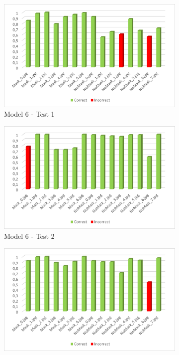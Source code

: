 \documentclass[a4paper,12pt]{article}
\begin{document}
\begin{figure}%
    \centering
    \begin{subfigure}{6cm}
        \includegraphics[width=\linewidth]{images_latex/test6_1.png}
        \caption{Model 6 - Test 1}
    \end{subfigure}
    \qquad
    \begin{subfigure}{6cm}
        \includegraphics[width=\linewidth]{images_latex/test6_2.png}
        \caption{ Model 6 - Test 2}
    \end{subfigure}
    \qquad
    \begin{subfigure}{6cm}
        \includegraphics[width=\linewidth]{images_latex/test6_3.png}

\end{subfigure}
\end{figure}
\end{document}
